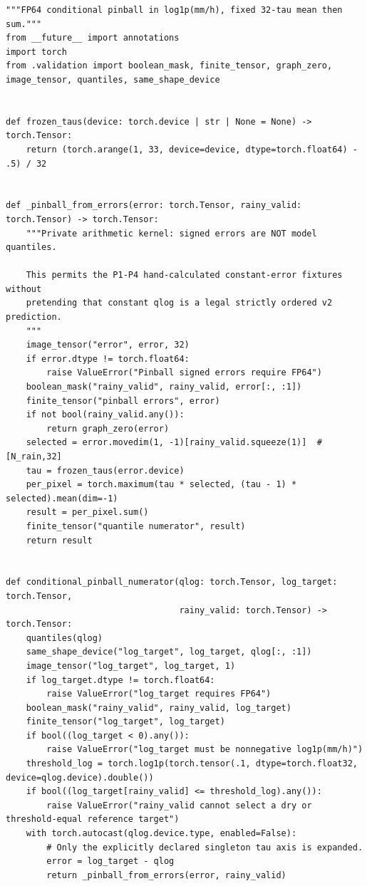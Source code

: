\documentclass[UTF8,fontset=fandol,10pt]{ctexart}
\begin{document}
\begin{lstlisting}
"""FP64 conditional pinball in log1p(mm/h), fixed 32-tau mean then sum."""
from __future__ import annotations
import torch
from .validation import boolean_mask, finite_tensor, graph_zero, image_tensor, quantiles, same_shape_device


def frozen_taus(device: torch.device | str | None = None) -> torch.Tensor:
    return (torch.arange(1, 33, device=device, dtype=torch.float64) - .5) / 32


def _pinball_from_errors(error: torch.Tensor, rainy_valid: torch.Tensor) -> torch.Tensor:
    """Private arithmetic kernel: signed errors are NOT model quantiles.

    This permits the P1-P4 hand-calculated constant-error fixtures without
    pretending that constant qlog is a legal strictly ordered v2 prediction.
    """
    image_tensor("error", error, 32)
    if error.dtype != torch.float64:
        raise ValueError("Pinball signed errors require FP64")
    boolean_mask("rainy_valid", rainy_valid, error[:, :1])
    finite_tensor("pinball errors", error)
    if not bool(rainy_valid.any()):
        return graph_zero(error)
    selected = error.movedim(1, -1)[rainy_valid.squeeze(1)]  # [N_rain,32]
    tau = frozen_taus(error.device)
    per_pixel = torch.maximum(tau * selected, (tau - 1) * selected).mean(dim=-1)
    result = per_pixel.sum()
    finite_tensor("quantile numerator", result)
    return result


def conditional_pinball_numerator(qlog: torch.Tensor, log_target: torch.Tensor,
                                  rainy_valid: torch.Tensor) -> torch.Tensor:
    quantiles(qlog)
    same_shape_device("log_target", log_target, qlog[:, :1])
    image_tensor("log_target", log_target, 1)
    if log_target.dtype != torch.float64:
        raise ValueError("log_target requires FP64")
    boolean_mask("rainy_valid", rainy_valid, log_target)
    finite_tensor("log_target", log_target)
    if bool((log_target < 0).any()):
        raise ValueError("log_target must be nonnegative log1p(mm/h)")
    threshold_log = torch.log1p(torch.tensor(.1, dtype=torch.float32, device=qlog.device).double())
    if bool((log_target[rainy_valid] <= threshold_log).any()):
        raise ValueError("rainy_valid cannot select a dry or threshold-equal reference target")
    with torch.autocast(qlog.device.type, enabled=False):
        # Only the explicitly declared singleton tau axis is expanded.
        error = log_target - qlog
        return _pinball_from_errors(error, rainy_valid)
\end{lstlisting}
\end{document}
